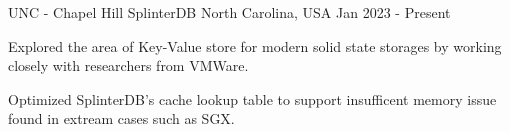 

\begin{cventries}

  \cventry
    {UNC - Chapel Hill} %
    {SplinterDB} %
    {North Carolina, USA} %
    {Jan 2023 - Present} %
    {
      \begin{cvitems} %
        \item {Explored the area of Key-Value store for modern solid state storages by working closely with researchers from VMWare.}
        \item {Optimized SplinterDB's cache lookup table to support insufficent memory issue found in extream cases such as SGX.}
      \end{cvitems}
    }

    

\end{cventries}
